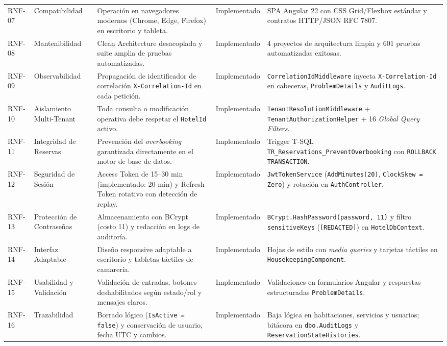 \documentclass[12pt,a4paper]{article}
\begin{document}
\begin{longtable}{p{1.5cm} p{2.3cm} p{4.6cm} p{2.1cm} p{3.9cm}}
RNF-07 & Compatibilidad & Operaci\'on en navegadores modernos (Chrome, Edge, Firefox) en escritorio y tableta. & Implementado & SPA Angular 22 con CSS Grid/Flexbox est\'andar y contratos HTTP/JSON RFC 7807.\\[0.1cm]
RNF-08 & Mantenibilidad & Clean Architecture desacoplada y suite amplia de pruebas automatizadas. & Implementado & 4 proyectos de arquitectura limpia y 601 pruebas automatizadas exitosas.\\[0.1cm]
RNF-09 & Observabilidad & Propagaci\'on de identificador de correlaci\'on \texttt{X-Correlation-Id} en cada petici\'on. & Implementado & \texttt{CorrelationIdMiddleware} inyecta \texttt{X-Correlation-Id} en cabeceras, \texttt{ProblemDetails} y \texttt{AuditLogs}.\\[0.1cm]
RNF-10 & Aislamiento Multi-Tenant & Toda consulta o modificaci\'on operativa debe respetar el \texttt{HotelId} activo. & Implementado & \texttt{TenantResolutionMiddleware} + \texttt{TenantAuthorizationHelper} + 16 \textit{Global Query Filters}.\\[0.1cm]
RNF-11 & Integridad de Reservas & Prevenci\'on del \textit{overbooking} garantizada directamente en el motor de base de datos. & Implementado & Trigger T-SQL \texttt{TR\_Reservations\_PreventOverbooking} con \texttt{ROLLBACK TRANSACTION}.\\[0.1cm]
RNF-12 & Seguridad de Sesi\'on & Access Token de 15--30 min (implementado: 20 min) y Refresh Token rotativo con detecci\'on de replay. & Implementado & \texttt{JwtTokenService} (\texttt{AddMinutes(20)}, \texttt{ClockSkew = Zero}) y rotaci\'on en \texttt{AuthController}.\\[0.1cm]
RNF-13 & Protecci\'on de Contrase\~nas & Almacenamiento con BCrypt (costo 11) y redacci\'on en logs de auditor\'ia. & Implementado & \texttt{BCrypt.HashPassword(password, 11)} y filtro \texttt{sensitiveKeys} (\texttt{[REDACTED]}) en \texttt{HotelDbContext}.\\[0.1cm]
RNF-14 & Interfaz Adaptable & Dise\~no responsive adaptable a escritorio y tabletas t\'actiles de camarer\'ia. & Implementado & Hojas de estilo con \textit{media queries} y tarjetas t\'actiles en \texttt{HousekeepingComponent}.\\[0.1cm]
RNF-15 & Usabilidad y Validaci\'on & Validaci\'on de entradas, botones deshabilitados seg\'un estado/rol y mensajes claros. & Implementado & Validaciones en formularios Angular y respuestas estructuradas \texttt{ProblemDetails}.\\[0.1cm]
RNF-16 & Trazabilidad & Borrado l\'ogico (\texttt{IsActive = false}) y conservaci\'on de usuario, fecha UTC y cambios. & Implementado & Baja l\'ogica en habitaciones, servicios y usuarios; bit\'acora en \texttt{dbo.AuditLogs} y \texttt{ReservationStateHistories}.\\
\end{longtable}
\end{document}
